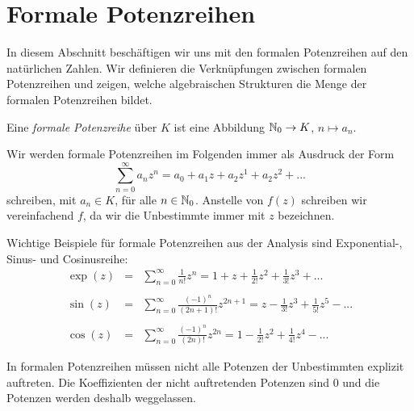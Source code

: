 \section{Formale Potenzreihen}\label{potenzreihenring}

%
In diesem Abschnitt beschäftigen wir uns mit den formalen Potenzreihen auf den natürlichen Zahlen. Wir definieren die Verknüpfungen zwischen formalen Potenzreihen und zeigen, welche algebraischen Strukturen die Menge der formalen Potenzreihen bildet.
  
\begin{defn}
Eine \textit{formale Potenzreihe} über $K$ ist eine Abbildung $\mathbb{N}_0 \rightarrow K$, $n \mapsto a_n$.
\end{defn}
\begin{bemnota}
Wir werden formale Potenzreihen im Folgenden immer als Ausdruck der Form
\begin{equation}\label{eq: formalepotenzreihe}
\sum_{n=0}^\infty a_n z^n = a_0 + a_1z + a_2z^1 + a_2z^2 + ...
\end{equation}
schreiben, mit $a_n \in K$, für alle $n \in \mathbb{N}_0$.
Anstelle von $f(z)$ schreiben wir vereinfachend $f$, da wir die Unbestimmte immer mit $z$ bezeichnen.
\end{bemnota}
%
%
%
% 
%
%
%
\begin{bsp}
Wichtige Beispiele für formale Potenzreihen aus der Analysis sind Exponential-, Sinus- und Cosinusreihe:
\begin{eqnarray*}
\exp(z) &=& \sum_{n=0}^{\infty} \frac{1}{n!} z^n
= 1 + z +\frac{1}{2!} z^2 + \frac{1}{3!} z^3 + ... \\ \\
\sin(z) &=& \sum_{n= 0}^{\infty} \frac{\left(-1\right)^n}{\left(2n + 1\right)!} z^{2n+1} = z - \frac{1}{3!} z^3 + \frac{1}{5!} z^5 - ...\\\\
\cos(z) &=& \sum_{n= 0}^{\infty} \frac{\left(-1\right)^n}{\left(2n\right)!} z^{2n}
= 1 - \frac{1}{2!} z^2 + \frac{1}{4!} z^4 - ...
\end{eqnarray*}
\end{bsp}
%
\begin{bem}
In formalen Potenzreihen müssen nicht alle Potenzen der Unbestimmten explizit auftreten. Die Koeffizienten der nicht auftretenden Potenzen sind $0$ und die Potenzen werden deshalb weggelassen.
\end{bem}
%
